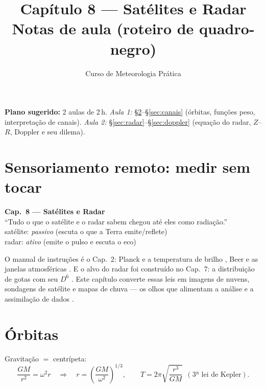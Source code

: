 \documentclass[11pt]{article}
\title{Capítulo 8 --- Satélites e Radar\\
{\large Notas de aula (roteiro de quadro-negro)}}
\author{Curso de Meteorologia Prática}
\date{}
\begin{document}
\maketitle
\thispagestyle{fancy}

\noindent\textbf{Plano sugerido:} 2 aulas de 2\,h.
\emph{Aula 1:} \S\ref{sec:orbitas}--\S\ref{sec:canais} (órbitas, funções
peso, interpretação de canais).
\emph{Aula 2:} \S\ref{sec:radar}--\S\ref{sec:doppler} (equação do radar,
$Z$--$R$, Doppler e seu dilema).

\section{Sensoriamento remoto: medir sem tocar}

\begin{noquadro}[abertura]
\textbf{Cap.~8 --- Satélites e Radar}\\[2pt]
``Tudo o que o satélite e o radar sabem chegou até eles como
radiação.''\\[2pt]
satélite: \emph{passivo} (escuta o que a Terra emite/reflete)\\
radar: \emph{ativo} (emite o pulso e escuta o eco)
\end{noquadro}

O manual de instruções é o Cap.~2: Planck e a temperatura de brilho
, Beer e as janelas atmosféricas
. E o alvo do radar foi construído no
Cap.~7: a distribuição de gotas com seu $D^6$
. Este capítulo converte essas leis em
imagens de nuvens, sondagens de satélite e mapas de chuva — os olhos que
alimentam a análise  e a assimilação de
dados .

\section{Órbitas}\label{sec:orbitas}


\begin{formadif}
Gravitação $=$ centrípeta:
\[ \frac{GM}{r^2} = \omega^2 r
\quad\Longrightarrow\quad
r = \left(\frac{GM}{\omega^2}\right)^{1/3},\qquad
T = 2\pi\sqrt{\frac{r^3}{GM}}\ \ (\text{3ª lei de Kepler}). \]
\end{formadif}
\end{document}
